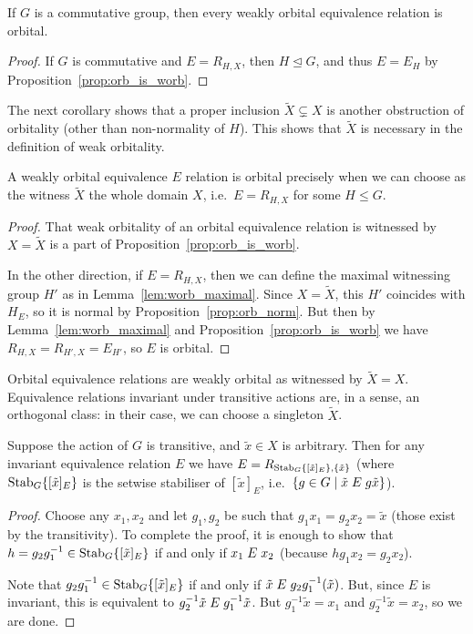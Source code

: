 	\begin{cor}
		\label{cor:comm_worb}
		If $G$ is a commutative group, then every weakly orbital equivalence relation is orbital.
	\end{cor}
	\begin{proof}
		If $G$ is commutative and $E=R_{H,X}$, then $H\unlhd G$, and thus $E=E_H$ by Proposition~\ref{prop:orb_is_worb}.
	\end{proof}
	
	The next corollary shows that a proper inclusion $\tilde X\subsetneq X$ is another obstruction of orbitality (other than non-normality of $H$). This shows that $\tilde X$ is necessary in the definition of weak orbitality.
	
	\begin{cor}
		\label{cor:orb_gap2}
		A weakly orbital equivalence $E$ relation is orbital precisely when we can choose as the witness $\tilde X$ the whole domain $X$, i.e.\ $E=R_{H,X}$ for some $H\leq G$.
	\end{cor}
	\begin{proof}
		That weak orbitality of an orbital equivalence relation is witnessed by $X=\tilde X$ is a part of Proposition~\ref{prop:orb_is_worb}.
		
		In the other direction, if $E=R_{H,X}$, then we can define the maximal witnessing group $H'$ as in Lemma~\ref{lem:worb_maximal}. Since $X=\tilde X$, this $H'$ coincides with $H_E$, so it is normal by Proposition~\ref{prop:orb_norm}. But then by Lemma~\ref{lem:worb_maximal} and Proposition~\ref{prop:orb_is_worb} we have $R_{H,X}=R_{H',X}=E_{H'}$, so $E$ is orbital.
	\end{proof}
	
	Orbital equivalence relations are weakly orbital as witnessed by $\tilde X=X$. Equivalence relations invariant under transitive actions are, in a sense, an orthogonal class: in their case, we can choose a singleton $\tilde X$.
	
	\begin{prop}
		\label{prop:single_orbit}
		Suppose the action of $G$ is transitive, and $\tilde x \in X$ is arbitrary. Then for any invariant equivalence relation $E$ we have $E=R_{\operatorname{{Stab}}_G\{[\tilde x ]_E\},\{\tilde x \}}$ (where $\operatorname{{Stab}}_G\{[\tilde x ]_E\}$ is the setwise stabiliser of $[\tilde x ]_E$, i.e.\ $\{g\in G\mid \tilde x\mathrel{E} g\tilde x \}$).
	\end{prop}
	\begin{proof}
		Choose any $x_1,x_2$ and let $g_1,g_2$ be such that $g_1x_1=g_2x_2=\tilde x $ (those exist by the transitivity). To complete the proof, it is enough to show that $h=g_2g_1^{-1}\in \operatorname{{Stab}}_G\{[\tilde x ]_E\}$ if and only if $x_1\mathrel{E} x_2$ (because $hg_1x_2=g_2x_2$).
		
		Note that $g_2g_1^{-1}\in \operatorname{{Stab}}_G\{[\tilde x ]_E\}$ if and only if $\tilde x \mathrel{E} g_2g_1^{-1}(\tilde x )$. But, since $E$ is invariant, this is equivalent to $g_2^{-1}\tilde x \mathrel{E} g_1^{-1}\tilde x $. But $g_1^{-1}\tilde x =x_1$ and $g_2^{-1}\tilde x =x_2$, so we are done.
	\end{proof}
	
